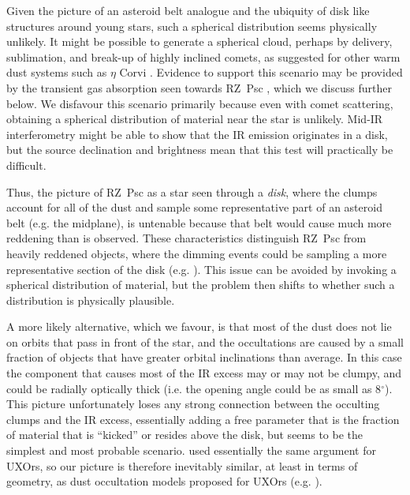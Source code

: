 \documentclass[]{rsos}
\begin{document}
Given the picture of an asteroid belt analogue and the ubiquity of disk like structures
around young stars, such a spherical distribution seems physically unlikely. It might be
possible to generate a spherical cloud, perhaps by delivery, sublimation, and break-up of
highly inclined comets, as suggested for other warm dust systems such as $\eta$ Corvi
\cite{2007ApJ...658..569W,2012ApJ...747...93L}. Evidence to support this scenario may be
provided by the transient gas absorption seen towards RZ~Psc \cite{2013Ap.....56..453P},
which we discuss further below. We disfavour this scenario primarily because even with
comet scattering, obtaining a spherical distribution of material near the star is
unlikely. Mid-IR interferometry might be able to show that the IR emission originates in
a disk, but the source declination and brightness mean that this test will practically be
difficult.

Thus, the picture of RZ~Psc as a star seen through a \emph{disk}, where the clumps
account for all of the dust and sample some representative part of an asteroid belt
(e.g. the midplane), is untenable because that belt would cause much more reddening than
is observed. These characteristics distinguish RZ~Psc from heavily reddened objects,
where the dimming events could be sampling a more representative section of the disk
(e.g. \cite{2015MNRAS.451...26S}). This issue can be avoided by invoking a spherical
distribution of material, but the problem then shifts to whether such a distribution is
physically plausible.

A more likely alternative, which we favour, is that most of the dust does not lie on
orbits that pass in front of the star, and the occultations are caused by a small
fraction of objects that have greater orbital inclinations than average. In this case the
component that causes most of the IR excess may or may not be clumpy, and could be
radially optically thick (i.e. the opening angle could be as small as 8$^\circ$). This
picture unfortunately loses any strong connection between the occulting clumps and the IR
excess, essentially adding a free parameter that is the fraction of material that is
``kicked'' or resides above the disk, but seems to be the simplest and most probable
scenario. \cite{2003ApJ...594L..47D} used essentially the same argument for UXOrs, so
our picture is therefore inevitably similar, at least in terms of geometry, as dust
occultation models proposed for UXOrs
(e.g. \cite{1997ApJ...491..885N,2000A&A...364..633N,2003ApJ...594L..47D}).
\end{document}

